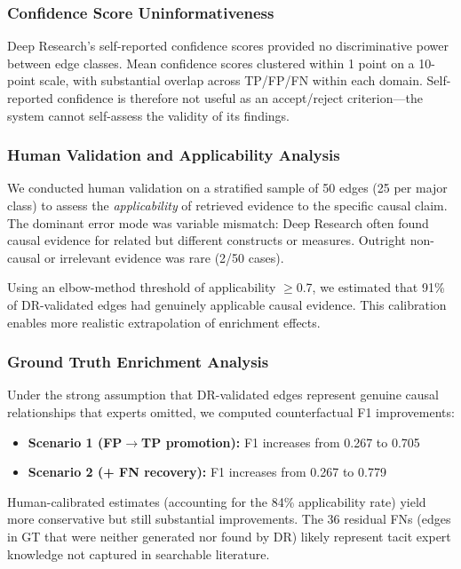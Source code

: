 \subsubsection{Confidence Score Uninformativeness}

Deep Research's self-reported confidence scores provided no discriminative power between edge classes. Mean confidence scores clustered within 1 point on a 10-point scale, with substantial overlap across TP/FP/FN within each domain. Self-reported confidence is therefore not useful as an accept/reject criterion---the system cannot self-assess the validity of its findings.

\subsubsection{Human Validation and Applicability Analysis}

We conducted human validation on a stratified sample of 50 edges (25 per major class) to assess the \textit{applicability} of retrieved evidence to the specific causal claim. The dominant error mode was variable mismatch: Deep Research often found causal evidence for related but different constructs or measures. Outright non-causal or irrelevant evidence was rare (2/50 cases).

Using an elbow-method threshold of applicability $\geq$0.7, we estimated that 91\% of DR-validated edges had genuinely applicable causal evidence. This calibration enables more realistic extrapolation of enrichment effects.

\subsubsection{Ground Truth Enrichment Analysis}

Under the strong assumption that DR-validated edges represent genuine causal relationships that experts omitted, we computed counterfactual F1 improvements:
\begin{itemize}[noitemsep]
    \item \textbf{Scenario 1 (FP$\rightarrow$TP promotion):} F1 increases from 0.267 to 0.705
    \item \textbf{Scenario 2 (+ FN recovery):} F1 increases from 0.267 to 0.779
\end{itemize}

Human-calibrated estimates (accounting for the 84\% applicability rate) yield more conservative but still substantial improvements. The 36 residual FNs (edges in GT that were neither generated nor found by DR) likely represent tacit expert knowledge not captured in searchable literature.

